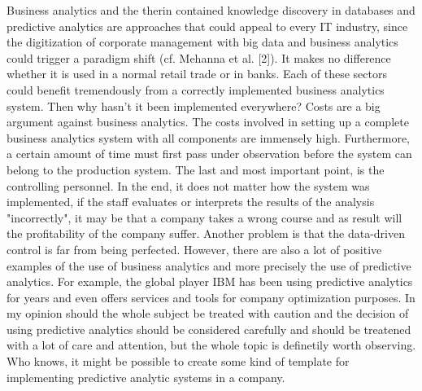 \documentclass[12pt,twocolumn,twoside]{conference}   %
\begin{document}
Business analytics and the therin contained  knowledge discovery in databases and predictive analytics are approaches that could appeal to every IT industry, since the digitization of corporate management with big data and business analytics could trigger a paradigm shift (cf. Mehanna et al. [2]). It makes no difference whether it is used in a normal retail trade or in banks. Each of these sectors could benefit tremendously from a correctly implemented business analytics system. Then why hasn't it been implemented everywhere? Costs are a big argument against business analytics. The costs involved in setting up a complete business analytics system with all components are immensely high. Furthermore, a certain amount of time must first pass under observation before the system can belong to the production system. The last and most important point, is the controlling personnel. In the end, it does not matter how the system was implemented, if the staff evaluates or interprets the results of the analysis "incorrectly", it may be that a company takes a wrong course and as result will the profitability of the company  suffer. Another problem is that the data-driven control is far from being perfected. However, there are also a lot of positive examples of the use of business analytics and more precisely the use of predictive analytics. For example, the global player IBM has been using predictive analytics for years and even offers services and tools for company optimization purposes. In my opinion should the whole subject be treated with caution and the decision of using predictive analytics should be considered carefully and should be treatened with a lot of care and attention, but the whole topic is definetily worth observing. Who knows, it might be possible to create some kind of template for implementing predictive analytic systems in a company.
\newpage
\end{document}

